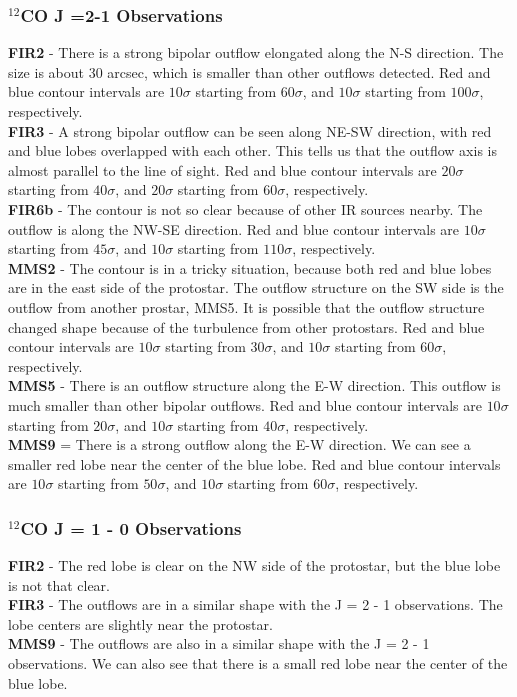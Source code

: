 \documentclass[twoside,11pt]{gshs_thesis}
\begin{document}
\subsubsection{$^{12}$CO J =2-1 Observations}
\noindent\textbf{FIR2} - There is a strong bipolar outflow elongated along the N-S direction. The size is about 30 arcsec, which is smaller than other outflows detected. Red and blue contour intervals are $10\sigma$ starting from $60\sigma$, and $10\sigma$ starting from $100\sigma$, respectively.\\
\textbf{FIR3} - A strong bipolar outflow can be seen along NE-SW direction, with red and blue lobes overlapped with each other. This tells us that the outflow axis is almost parallel to the line of sight. Red and blue contour intervals are $20\sigma$ starting from $40\sigma$, and $20\sigma$ starting from $60\sigma$, respectively. \\
\textbf{FIR6b} - The contour is not so clear because of other IR sources nearby. The outflow is along the NW-SE direction. Red and blue contour intervals are $10\sigma$ starting from $45\sigma$, and $10\sigma$ starting from $110\sigma$, respectively.\\
\textbf{MMS2} - The contour is in a tricky situation, because both red and blue lobes are in the east side of the protostar. The outflow structure on the SW side is the outflow from another prostar, MMS5. It is possible that the outflow structure changed shape because of the turbulence from other protostars. Red and blue contour intervals are $10\sigma$ starting from $30\sigma$, and $10\sigma$ starting from $60\sigma$, respectively.\\
\textbf{MMS5} - There is an outflow structure along the E-W direction. This outflow is much smaller than other bipolar outflows. Red and blue contour intervals are $10\sigma$ starting from $20\sigma$, and $10\sigma$ starting from $40\sigma$, respectively.\\
\textbf{MMS9} = There is a strong outflow along the E-W direction. We can see a smaller red lobe near the center of the blue lobe. Red and blue contour intervals are $10\sigma$ starting from $50\sigma$, and $10\sigma$ starting from $60\sigma$, respectively.\\

\subsubsection{$^{12}$CO J = 1 - 0 Observations}
\textbf{FIR2} - The red lobe is clear on the NW side of the protostar, but the blue lobe is not that clear.\\
\textbf{FIR3} - The outflows are in a similar shape with the J = 2 - 1 observations. The lobe centers are slightly near the protostar.\\
\textbf{MMS9} - The outflows are also in a similar shape with the J = 2 - 1 observations. We can also see that there is a small red lobe near the center of the blue lobe.\\
\newpage
\end{document}
